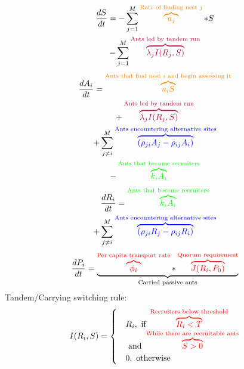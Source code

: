 \documentclass[letterpaper]{article}
\makeatletter
\def\mcolor#1#{\@mcolor{#1}}
\def\@mcolor#1#2#3{%
  \protect\leavevmode
  \begingroup
    \color#1{#2}#3%
  \endgroup
}
\newcommand{\annotate}[3]{
\mcolor{#1}{\overbrace{#3}^\text{#2}}
}
\makeatother
\begin{document}
      \Large
      \begin{multline}
      \frac{dS}{dt} = - \sum_{j=1}^M \annotate{orange}{Rate of finding nest $j$}{u_j}*S \\  
      - \sum_{j=1}^M \annotate{purple}{Ants led by tandem run}{\lambda_jI(R_j, S)} 
      \end{multline}
      \Large
      \begin{multline}
      \frac{dA_i}{dt} = \annotate{orange}{Ants that find nest $i$ and begin assessing it}{u_iS} \\ 
      + \annotate{purple}{Ants led by tandem run}{\lambda_jI(R_j, S)} \\
      + \sum_{j \neq i}^M \annotate{blue}{Ants encountering alternative sites}{(\rho_{ji}A_j - \rho_{ij}A_i)} \\ 
      - \annotate{green}{Ants that become recruiters}{k_iA_i} \\
      \end{multline}
      \Large
      \begin{multline}
          \frac{dR_i}{dt} = \annotate{green}{Ants that become recruiters}{k_iA_i} \\
          + \sum_{j \neq i}^M \annotate{blue}{Ants encountering alternative sites}{(\rho_{ji}R_j - \rho_{ij}R_i)}
      \end{multline}
      \Large
      \begin{equation}
          \frac{dP_i}{dt} = \underbrace{\annotate{red}{Per capita transport rate}{\phi_i} * \annotate{red}{Quorum requirement}{J(R_i, P_0)}}_\text{Carried passive ants}
      \end{equation}
      \Large
      Tandem/Carrying switching rule:
      \begin{equation}
          I(R_i, S) = 
          \begin{cases}
              & R_i,  \text{ if } \annotate{red}{Recruiters below threshold}{R_i < T} \\
              &       \text{     and } \annotate{red}{While there are recruitable ants}{S > 0}\\
              & 0, \text{ otherwise}
          \end{cases}
      \end{equation}
\end{document}
